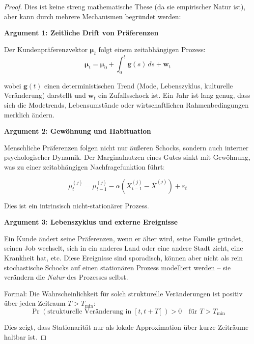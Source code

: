 \documentclass[12pt, a4paper, titlepage]{report}
\theoremstyle{definition}
\theoremstyle{remark}
\begin{document}
\begin{proof}
Dies ist keine streng mathematische These (da sie empirischer Natur ist), aber kann durch mehrere Mechanismen begründet werden:

\textbf{Argument 1: Zeitliche Drift von Präferenzen}

Der Kundenpräferenzvektor $\bm{\mu}_t$ folgt einem zeitabhängigen Prozess:
\begin{equation}
\bm{\mu}_t = \bm{\mu}_0 + \int_0^t \bm{g}(s) \, ds + \bm{w}_t
\end{equation}

wobei $\bm{g}(t)$ einen deterministischen Trend (Mode, Lebenszyklus, kulturelle Veränderung) darstellt und $\bm{w}_t$ ein Zufallsschock ist. Ein Jahr ist lang genug, dass sich die Modetrends, Lebensumstände oder wirtschaftlichen Rahmenbedingungen merklich ändern.

\textbf{Argument 2: Gewöhnung und Habituation}

Menschliche Präferenzen folgen nicht nur äußeren Schocks, sondern auch interner psychologischer Dynamik. Der Marginalnutzen eines Gutes sinkt mit Gewöhnung, was zu einer zeitabhängigen Nachfragefunktion führt:

\begin{equation}
\mu_t^{(j)} = \mu_{t-1}^{(j)} - \alpha (X_{t-1}^{(j)} - \overline{X}^{(j)}) + \varepsilon_t
\end{equation}

Dies ist ein intrinsisch nicht-stationärer Prozess.

\textbf{Argument 3: Lebenszyklus und externe Ereignisse}

Ein Kunde ändert seine Präferenzen, wenn er älter wird, seine Familie gründet, seinen Job wechselt, sich in ein anderes Land oder eine andere Stadt zieht, eine Krankheit hat, etc. Diese Ereignisse sind sporadisch, können aber nicht als rein stochastische Schocks auf einen stationären Prozess modelliert werden – sie verändern die \emph{Natur} des Prozesses selbst.

Formal: Die Wahrscheinlichkeit für solch strukturelle Veränderungen ist positiv über jeden Zeitraum $T > T_{\min}$:
\begin{equation}
\Pr(\text{strukturelle Veränderung in } [t, t+T]) > 0 \quad \text{für } T > T_{\min}
\end{equation}

Dies zeigt, dass Stationarität nur als lokale Approximation über kurze Zeiträume haltbar ist.
\end{proof}
\end{document}
